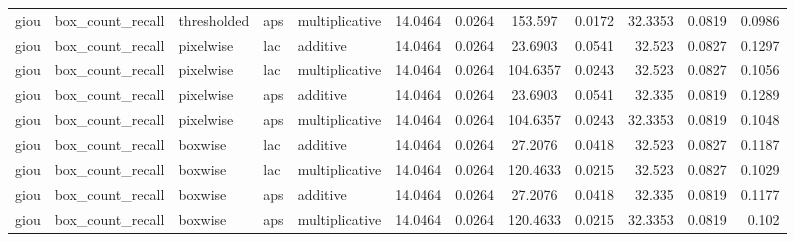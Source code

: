 \begin{table*}[htbp]
\begin{tabular}{@{}lllll rrcrrcr@{}}
giou & box\_count\_recall & thresholded & aps & multiplicative & 14.0464 & 0.0264 & 153.597 & 0.0172 & 32.3353 & 0.0819 & 0.0986 \\
giou & box\_count\_recall & pixelwise & lac & additive & 14.0464 & 0.0264 & 23.6903 & 0.0541 & 32.523 & 0.0827 & 0.1297 \\
giou & box\_count\_recall & pixelwise & lac & multiplicative & 14.0464 & 0.0264 & 104.6357 & 0.0243 & 32.523 & 0.0827 & 0.1056 \\
giou & box\_count\_recall & pixelwise & aps & additive & 14.0464 & 0.0264 & 23.6903 & 0.0541 & 32.335 & 0.0819 & 0.1289 \\
giou & box\_count\_recall & pixelwise & aps & multiplicative & 14.0464 & 0.0264 & 104.6357 & 0.0243 & 32.3353 & 0.0819 & 0.1048 \\
giou & box\_count\_recall & boxwise & lac & additive & 14.0464 & 0.0264 & 27.2076 & 0.0418 & 32.523 & 0.0827 & 0.1187 \\
giou & box\_count\_recall & boxwise & lac & multiplicative & 14.0464 & 0.0264 & 120.4633 & 0.0215 & 32.523 & 0.0827 & 0.1029 \\
giou & box\_count\_recall & boxwise & aps & additive & 14.0464 & 0.0264 & 27.2076 & 0.0418 & 32.335 & 0.0819 & 0.1177 \\
giou & box\_count\_recall & boxwise & aps & multiplicative & 14.0464 & 0.0264 & 120.4633 & 0.0215 & 32.3353 & 0.0819 & 0.102 \\
    \bottomrule
    \end{tabular}
    \end{table*}
    